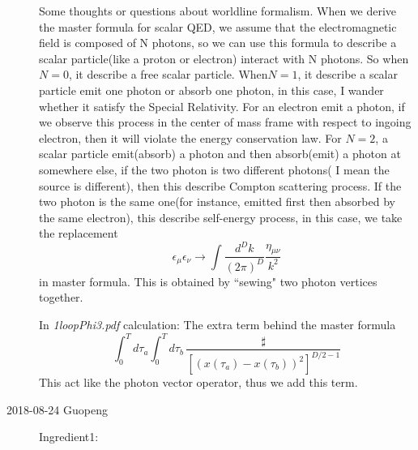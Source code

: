 \begin{description}
Some thoughts or questions about worldline formalism.
When we derive the master formula for scalar QED, we assume that the electromagnetic field is composed of N photons, so we can use this formula to describe a scalar particle(like a proton or electron) interact with N photons. So when $N=0$, it describe a free scalar particle. When$N=1$, it describe a scalar particle emit one photon or absorb one photon, in this case, I wander whether it satisfy the Special Relativity. For an electron emit a photon, if we observe this process in the center of mass frame with respect to ingoing electron, then it will violate the energy conservation law. For $N=2$, a scalar particle emit(absorb) a photon and then absorb(emit) a photon at somewhere else, if the two photon is two different photons( I mean the source is different), then this describe Compton scattering process. If the two photon is the same one(for instance, emitted first then absorbed by the same electron), this describe self-energy process, in this case, we take the replacement
\[
\epsilon_\mu\epsilon_\nu\longrightarrow\int\frac{d^{D}k}{(2\pi)^{D}}\frac{\eta_{\mu\nu}}{k^2}
\]
in master formula. This is obtained by ``sewing" two photon vertices together.


In {\em 1loopPhi3.pdf} calculation: The extra term behind the master formula
\[
\int_0^T \! d\tau_a\int_0^T \! d\tau_b  \,\frac{\sharp}{[(x(\tau_a)-x(\tau_b))^2]^{D/2-1}}
\]
This act like the photon vector operator, thus we add this term.


\item[2018-08-24 Guopeng]
Ingredient1:


\end{description}

